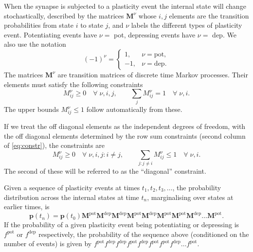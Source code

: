 \documentclass[12pt]{article}
\newcommand{\prm}{p}
\newcommand{\pr}{\mathbf{\prm}}
\newcommand{\MMdm}{M}
\newcommand{\MMd}{\mathbf{\MMdm}}
\newcommand{\pot}{^{\text{pot}}}
\newcommand{\dep}{^{\text{dep}}}
\begin{document}
When the synapse is subjected to a plasticity event the internal state will change stochastically, described by the matrices \(\MMd^\nu\) whose \(i,j\) elements are the transition probabilities from state \(i\) to state \(j\), 
and \(\nu \) labels the different types of plasticity event.
Potentiating events have \(\nu=\) pot, depressing events have \(\nu=\) dep.
We also use the notation
%
\begin{equation*}
  (-1)^\nu = 
    \begin{cases}
       1, & \nu = \text{pot}, \\
      -1, & \nu = \text{dep}.
    \end{cases}
\end{equation*}
%
The matrices \(\MMd^\nu\) are transition matrices of discrete time Markov processes.
Their elements must satisfy the following constraints
%
\begin{equation}\label{eq:constr}
  \MMdm^\nu_{ij} \geq 0 
    \quad \forall \; \nu, i, j, \qquad
  \sum_j \MMdm^\nu_{ij} = 1
    \quad \forall \; \nu, i.
\end{equation}
%
The upper bounds \(\MMdm^\nu_{ij} \leq 1\) follow automatically from these.

If we treat the off diagonal elements as the independent degrees of freedom, with the off diagonal elements determined by the row sum constraints (second column of \eqref{eq:constr}), the constraints are
%
\begin{equation}\label{eq:constri}
  \MMdm^\nu_{i j} \geq 0
    \quad \forall \; \nu, i, j : i \neq j, \qquad
  \sum_{j : j\neq i} \MMdm^\nu_{ij} \leq 1
    \quad \forall \; \nu, i.
\end{equation}
%
The second of these will be referred to as the ``diagonal'' constraint.

Given a sequence of plasticity events at times \(t_1,t_2,t_3,\ldots\), the probability distribution across the internal states at time \(t_n\), 
marginalising over states at earlier times, is
%
\begin{equation}\label{eq:plastseq}
  \pr(t_n) = \pr(t_0)  \MMd \pot \MMd \dep \MMd \dep \MMd \pot \MMd \dep \MMd \pot \MMd \pot \MMd \dep \ldots \MMd \pot .
\end{equation}
%
If the probability of a given plasticity event being potentiating or depressing is \(f\pot\) or \(f\dep\) respectively, the probability of the sequence above (conditioned on the number of events) is given by \(f\pot f\dep f\dep f\pot f\dep f\pot f\pot f\dep \ldots f\pot\).
\end{document}
